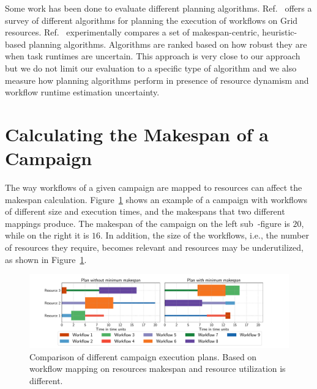 Some work has been done to evaluate different planning algorithms.
Ref.~\cite{wieczorek2005scheduling} offers a survey of different algorithms for
planning the execution of workflows on Grid resources.
Ref.~\cite{canon2008comparative} experimentally compares a set of
makespan-centric, heuristic-based planning algorithms. Algorithms are ranked
based on how robust they are when task runtimes are uncertain. This approach is
very close to our approach but we do not limit our evaluation to a specific type
of algorithm and we also measure how planning algorithms perform in presence of
resource dynamism and workflow runtime estimation uncertainty.

\section{Calculating the Makespan of a Campaign}
\label{sec:makespan_calc}

The way workflows of a given campaign are mapped to resources can affect the
makespan calculation. Figure~\ref{fig:example_makespan} shows an example of a
campaign with workflows of different size and execution times, and the
makespans that two different mappings produce. The makespan of the campaign on
the left sub~-figure is $20$, while on the right it is $16$. In addition, the
size of the workflows, i.e., the number of resources they require, becomes
relevant and resources may be underutilized, as shown in
Figure~\ref{fig:example_makespan}.

\begin{figure}[ht!]
    \centering
    \includegraphics[width=.99\textwidth]{figures/campaign/plan_comp.pdf}
    \caption{Comparison of different campaign execution plans. Based on workflow mapping on resources makespan and resource utilization is different.}\label{fig:example_makespan}
\end{figure}

